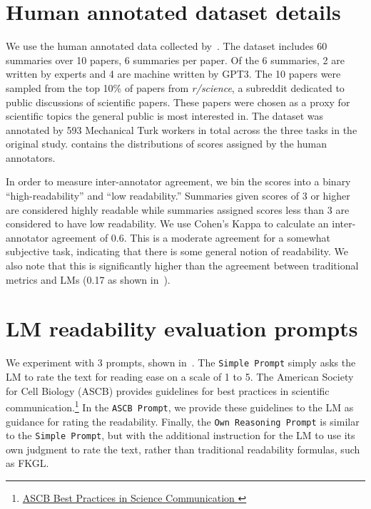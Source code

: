 \section{Human annotated dataset details}\label{appendix:dataset_details}
We use the human annotated data collected by~\textcite{August2024KnowYA}. The dataset includes 60 summaries over 10 papers, 6 summaries per paper. Of the 6 summaries, 2 are written by experts and 4 are machine written by GPT3. The 10 papers were sampled from the top 10\% of papers from \textit{r/science}, a subreddit dedicated to public discussions of scientific papers. These papers were chosen as a proxy for scientific topics the general public is most interested in. The dataset was annotated by 593 Mechanical Turk workers in total across the three tasks in the original study.
 contains the distributions of scores assigned by the human annotators.



In order to measure inter-annotator agreement, we bin the scores into a binary ``high-readability'' and ``low readability.'' Summaries given scores of 3 or higher are considered highly readable while summaries assigned scores less than 3 are considered to have low readability. We use Cohen's Kappa to calculate an inter-annotator agreement of 0.6. This is a moderate agreement for a somewhat subjective task, indicating that there is some general notion of readability. We also note that this is significantly higher than the agreement between traditional metrics and LMs (0.17 as shown in~).



\section{LM readability evaluation prompts}\label{appendix:prompt}
We experiment with 3 prompts, shown in~. The \texttt{Simple Prompt} simply asks the LM to rate the text for reading ease on a scale of 1 to 5. The American Society for Cell Biology (ASCB) provides guidelines for best practices in scientific communication.\footnote{\href{https://www.ascb.org/science-policy-public-outreach/science-outreach/communication-toolkits/best-practices-in-effective-science-communication/}{ASCB Best Practices in Science Communication
}} In the  \texttt{ASCB Prompt}, we provide these guidelines to the LM as guidance for rating the readability. Finally, the  \texttt{Own Reasoning Prompt} is similar to the  \texttt{Simple Prompt}, but with the additional instruction for the LM to use its own judgment to rate the text, rather than traditional readability formulas, such as FKGL. 

